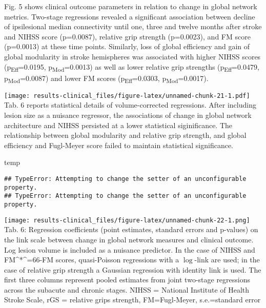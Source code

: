 \documentclass[]{article}
\newenvironment{Shaded}{\begin{snugshade}}{\end{snugshade}}
\newcommand{\NormalTok}[1]{#1}
\begin{document}
Fig. 5 shows clinical outcome parameters in relation to change in global
network metrics. Two-stage regressions revealed a significant
association between decline of ipsilesional median connectivity until
one, three and twelve months after stroke and NIHSS score (p=0.0087),
relative grip strength (p=0.0023), and FM score (p=0.0013) at these time
points. Similarly, loss of global efficiency and gain of global
modularity in stroke hemispheres was associated with higher NIHSS scores
(p\textsubscript{Eff}=0.0195, p\textsubscript{Mod}=0.0013) as well as
lower relative grip strengths (p\textsubscript{Eff}=0.0479,
p\textsubscript{Mod}=0.0087) and lower FM scores
(p\textsubscript{Eff}=0.0303, p\textsubscript{Mod}=0.0017).

\texttt{[image: results-clinical\_files/figure-latex/unnamed-chunk-21-1.pdf]}
Tab. 6 reports statistical details of volume-corrected regressions.
After including lesion size as a nuisance regressor, the associations of
change in global network architecture and NIHSS persisted at a lower
statistical siginificance. The relationship between global modularity
and relative grip strength, and global efficiency and Fugl-Meyer score
failed to maintain statistical significance.

\begin{Shaded}
\begin{Highlighting}[]
\NormalTok{temp}
\end{Highlighting}
\end{Shaded}

\begin{verbatim}
## TypeError: Attempting to change the setter of an unconfigurable property.
## TypeError: Attempting to change the setter of an unconfigurable property.
\end{verbatim}

\texttt{[image: results-clinical\_files/figure-latex/unnamed-chunk-22-1.png]}
Tab. 6: Regression coefficients (point estimates, standard errors and
p-values) on the link scale between change in global network measures
and clinical outcome. Log lesion volume is included as a nuisance
predictor. In the case of NIHSS and FM\^{}*\^{}=66-FM scores,
quasi-Poisson regressions with a \(\log\)-link are used; in the case of
relative grip strength a Gaussian regression with identity link is used.
The first three columns represent pooled estimates from joint two-stage
regressions across the subacute and chronic stages. NIHSS = National
Institute of Health Stroke Scale, rGS = relative grips strength,
FM=Fugl-Meyer, s.e.=standard error
\end{document}
